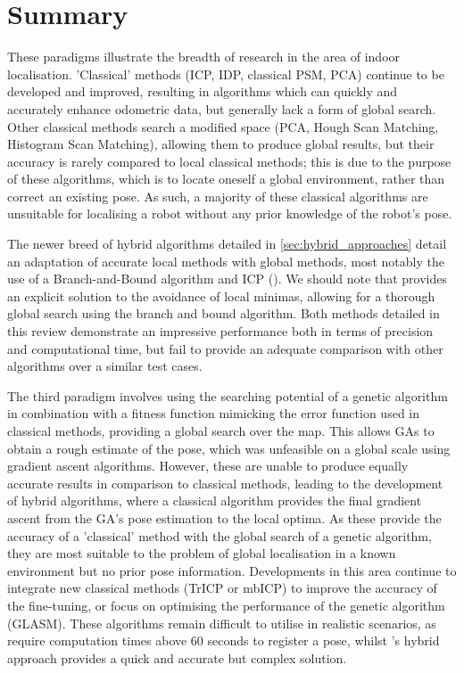 \documentclass[authoryearcitations]{UoYCSproject}
\begin{document}
\section{Summary}
These paradigms illustrate the breadth of research in the area of indoor localisation. 'Classical' methods (ICP, IDP, classical PSM, PCA) continue to be developed and improved, resulting in algorithms which can quickly and accurately enhance odometric data, but generally lack a form of global search. Other classical methods search a modified space (PCA, Hough Scan Matching, Histogram Scan Matching), allowing them to produce global results, but their accuracy is rarely compared to local classical methods; this is due to the purpose of these algorithms, which is to locate oneself a global environment, rather than correct an existing pose. As such, a majority of these classical algorithms are unsuitable for localising a robot without any prior knowledge of the robot's pose. \newline

\color{red}
The newer breed of hybrid algorithms detailed in \autoref{sec:hybrid_approaches} detail an adaptation of accurate local methods with global methods, most notably the use of a Branch-and-Bound algorithm and ICP (\citet{Yang2013-gx}). We should note that \citet{Yang2013-gx} provides an explicit solution to the avoidance of local minimas, allowing for a thorough global search using the branch and bound algorithm. Both methods detailed in this review demonstrate an impressive performance both in terms of precision and computational time, but fail to provide an adequate comparison with other algorithms over a similar test cases.  \newline


\color{black}

The third paradigm involves using the searching potential of a genetic algorithm in combination with a fitness function mimicking the error function used in classical methods, providing a global search over the map. This allows GAs to obtain a rough estimate of the pose, which was unfeasible on a global scale using gradient ascent algorithms. However, these are unable to produce equally accurate results in comparison to classical methods, leading to the development of hybrid algorithms, where a classical algorithm provides the final gradient ascent from the GA's pose estimation to the local optima. As these provide the accuracy of a 'classical' method with the global search of a genetic algorithm, they are most suitable to the problem of global localisation in a known environment but no prior pose information. Developments in this area continue to integrate new classical methods (TrICP or mbICP) to improve the accuracy of the fine-tuning, or focus on optimising the performance of the genetic algorithm (GLASM). These algorithms remain difficult to utilise in realistic scenarios, as \citet{Chow2004-xc} require computation times above 60 seconds to register a pose, whilst \citet{Lenac2011-co}'s hybrid approach provides a quick and accurate but complex solution. \newline
\end{document}
